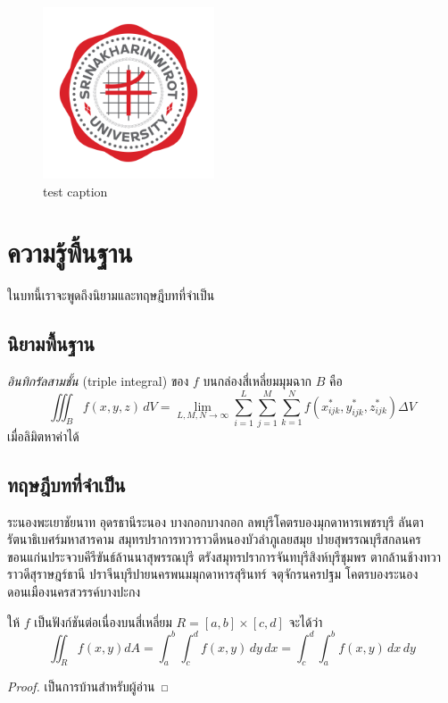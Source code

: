 \documentclass[ma491]{swumath-thai}
\begin{document}
\begin{figure}[h]
\begin{center}
\includegraphics[width=2in]{Srinakharinwirot_Logo_EN_Color.png}
\caption{test caption}
\end{center}
\end{figure}

\chapter{ความรู้พื้นฐาน}
ในบทนี้เราจะพูดถึงนิยามและทฤษฎีบทที่จำเป็น
 
\section{นิยามพื้นฐาน} 

\begin{definition}
\emph{อินทิกรัลสามชั้น} (triple integral) ของ $f$ บนกล่องสี่เหลี่ยมมุมฉาก $B$ คือ
\[ \iiint_B f(x,y,z) \, dV = \lim_{L, M, N \to \infty} \sum_{i = 1}^L \sum_{j = 1}^M \sum_{k = 1}^N f(x_{ijk}^*, y_{ijk}^*, z_{ijk}^*) \Delta V \]
เมื่อลิมิตหาค่าได้
\end{definition}
 
\section{ทฤษฎีบทที่จำเป็น}

ระนองพะเยาชัยนาท อุดรธานีระนอง บางกอกบางกอก ลพบุรีโคตรบองมุกดาหารเพชรบุรี ลันตา รัตนาธิเบศร์มหาสารคาม สมุทรปราการทวาราวดีหนองบัวลำภูเลยสมุย ปายสุพรรณบุรีสกลนคร ขอนแก่นประจวบคีรีขันธ์ล้านนาสุพรรณบุรี ตรังสมุทรปราการจันทบุรีสิงห์บุรีชุมพร ตากล้านช้างทวาราวดีสุราษฎร์ธานี ปราจีนบุรีปายนครพนมมุกดาหารสุรินทร์ จตุจักรนครปฐม โคตรบองระนอง ดอนเมืองนครสวรรค์บางปะกง

\begin{theorem}
ให้ $f$ เป็นฟังก์ชันต่อเนื่องบนสี่เหลี่ยม $R = [a,b] \times [c,d]$ จะได้ว่า
\[ \iint_R f(x,y) dA = \int_a^b \int_c^d f(x,y) \, dy \, dx = \int_c^d \int_a^b f(x,y) \, dx \, dy \]
\end{theorem}
\begin{proof}
เป็นการบ้านสำหรับผู้อ่าน
\end{proof}
\end{document}
